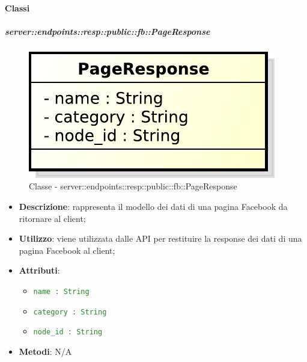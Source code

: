 	\paragraph{Classi} %

    \subparagraph{server::endpoints::resp::public::fb::PageResponse} %
    \label{subp:bdsm_app_server_endpoints_resp_public_fb_pageresponse}
	\begin{figure}[!htbp]
		\centering
		\centerline{\includegraphics[scale=0.6]{./images/server/classes/endpoints/fb/page_response.pdf}}
		\caption{Classe - server::endpoints::resp::public::fb::PageResponse}
	\end{figure}
    \begin{itemize}
      \item \textbf{Descrizione}: rappresenta il modello dei dati di una pagina Facebook da ritornare al client;
      \item \textbf{Utilizzo}: viene utilizzata dalle API per restituire la response dei dati di una pagina Facebook al client;

	  \item \textbf{Attributi}:
	  	\begin{itemize}
	  		\item \textcolor{forestgreen}{\texttt{name : String}}
	  		\item \textcolor{forestgreen}{\texttt{category : String}}
	  		\item \textcolor{forestgreen}{\texttt{node\_id : String}}
	  	\end{itemize}
	  \item \textbf{Metodi}: N/A
      \end{itemize}

